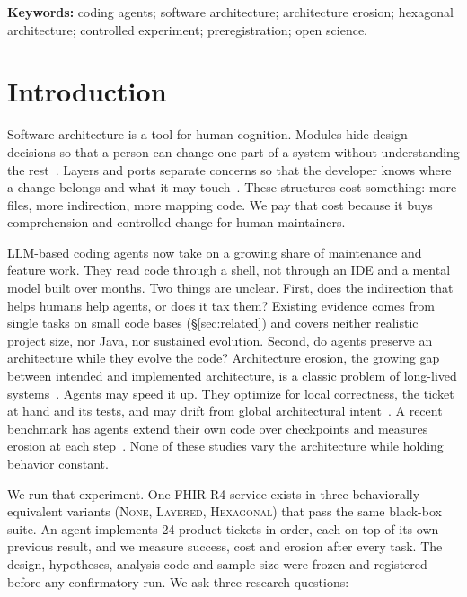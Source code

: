 \documentclass[10pt]{article}
\newcommand{\NONE}{\textsc{None}}
\newcommand{\LAY}{\textsc{Layered}}
\newcommand{\HEX}{\textsc{Hexagonal}}
\begin{document}
\noindent\textbf{Keywords:} coding agents; software architecture; architecture erosion;
hexagonal architecture; controlled experiment; preregistration; open science.

\section{Introduction}\label{sec:intro}

Software architecture is a tool for human cognition. Modules hide design decisions so that a
person can change one part of a system without understanding the rest~\citep{parnas1972criteria}.
Layers and ports separate concerns so that the developer knows where a change belongs and what it
may touch~\citep{buschmann1996posa,fowler2002peaa,cockburn2005hexagonal}. These structures cost
something: more files, more indirection, more mapping code. We pay that cost because it buys
comprehension and controlled change for human maintainers.

LLM-based coding agents now take on a growing share of maintenance and feature work. They read
code through a shell, not through an IDE and a mental model built over months. Two things are
unclear. First, does the indirection that helps humans help agents, or does it tax them? Existing
evidence comes from single tasks on small code bases (\S\ref{sec:related}) and covers neither
realistic project size, nor Java, nor sustained evolution. Second, do
agents preserve an architecture while they evolve the code? Architecture erosion, the growing gap
between intended and implemented architecture, is a classic problem of long-lived
systems~\citep{perry1992foundations,lehman1980programs,desilva2012erosion,li2022erosionmapping}.
Agents may speed it up. They optimize for local correctness, the ticket at hand and its tests,
and may drift from global architectural intent~\citep{agenticentropy2026}. A recent benchmark has agents extend their own code over checkpoints and measures erosion at
each step~\citep{slopcodebench2026}. None of these studies vary the architecture while holding
behavior constant.

We run that experiment. One FHIR R4 service exists in three behaviorally equivalent variants
(\NONE, \LAY, \HEX) that pass the same black-box suite. An agent implements 24 product tickets in
order, each on top of its own previous result, and we measure success, cost and erosion after
every task. The design, hypotheses, analysis code and sample size were frozen and registered
before any confirmatory run. We ask three research questions:
\end{document}
